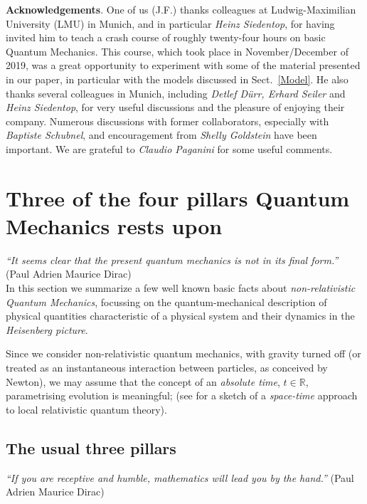 \documentclass[a4paper,11pt]{article}
\begin{document}
{\bf{Acknowledgements}}. One of us (J.F.) thanks colleagues at Ludwig-Maximilian University (LMU) in Munich, and 
in particular \textit{Heinz Siedentop}, for having invited him to teach a crash course of roughly twenty-four hours on 
basic Quantum  Mechanics. This course, which took place in November/December of 2019, was a great opportunity 
to experiment with some of the material presented in our paper, in particular with the models discussed in Sect.~\ref{Model}. 
He also thanks several colleagues in Munich, including \textit{Detlef D\"urr, Erhard Seiler} and \textit{Heinz Siedentop}, 
for very useful discussions and the pleasure of enjoying their company. Numerous discussions with former collaborators, especially with \textit{Baptiste Schubnel}, and encouragement from \textit{Shelly Goldstein} have been important. We are grateful to \textit{Claudio Paganini} for some useful comments.


\section{Three of the four pillars Quantum Mechanics rests upon}\label{three pillars}

\hspace{0.5cm} \textit{``It seems clear that the present quantum mechanics is not in its final form.''} (Paul Adrien Maurice Dirac)\\

In this section we summarize a few well known basic facts about \textit{non-relativistic Quantum Mechanics}, focussing on the quantum-mechanical description of physical quantities characteristic of a physical system and their 
dynamics in the \textit{Heisenberg picture}. 

Since we consider non-relativistic quantum mechanics, with gravity turned off (or treated as an instantaneous interaction 
between particles, as conceived by Newton), we may assume that the concept of an \textit{absolute time}, 
$t\in \mathbb{R}$, parametrising evolution is meaningful; (see \cite{Fr2} for a sketch of a \textit{space-time} 
approach to local relativistic quantum theory). 

\subsection{The usual three pillars}
\hspace{0.5cm}\textit{``If you are receptive and humble, mathematics will lead you by the hand.''} (Paul Adrien Maurice Dirac)
\end{document}
